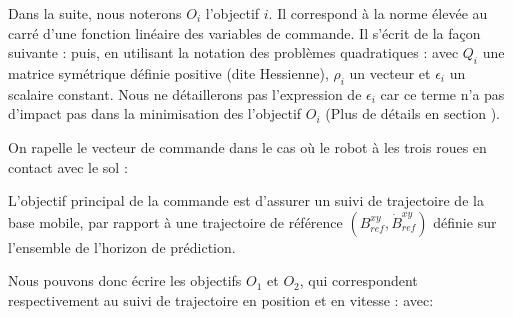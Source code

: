 				Dans la suite, nous noterons $O_i$ l'objectif $i$. Il correspond à la norme élevée au carré d'une fonction linéaire des variables de commande. Il s'écrit de la façon suivante :
				puis, en utilisant la notation des problèmes quadratiques :
				avec $Q_i$ une matrice symétrique définie positive (dite Hessienne), $\rho_i$ un vecteur et $\epsilon_i$ un scalaire constant.
				Nous ne détaillerons pas l'expression de $\epsilon_i$ car ce terme n'a pas d'impact pas dans la minimisation des l'objectif $O_i$ (Plus de détails en section ).
				
				On rapelle le vecteur de commande dans le cas où le robot à les trois roues en contact avec le sol :
				
					L'objectif principal de la commande est d'assurer un suivi de trajectoire de la base mobile, par rapport à une trajectoire de référence $(B^{xy}_{ref}, \dot{B}^{xy}_{ref})$ définie sur l'ensemble de l'horizon de prédiction.
					
					Nous pouvons donc écrire les objectifs $O_1$ et $O_2$, qui correspondent respectivement au suivi de trajectoire en position et en vitesse :
					avec:
				
